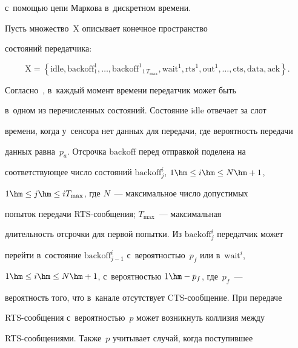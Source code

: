 с~по\-мощью цепи Маркова в~дискретном времени.











    Пусть множество~$\mathrm{X}$ описывает конечное пространство 


состояний передатчика:


\begin{equation*}


\mathrm{X}=\left\{ \mathrm{idle, backoff_1^1},\ldots , 


\mathrm{backoff^1}_{1\,T_{\max}}, \mathrm{wait}^1, 


\mathrm{rts}^1, \mathrm{out}^1, \ldots , \mathrm{cts}, \mathrm{data}, \mathrm{ack}\right\}.




\end{equation*}


Согласно~\cite{6-gai}, в~каждый момент времени передатчик может быть 


в~одном из перечисленных состояний. Состояние $\mathrm{idle}$ отвечает за слот 


времени, когда у~сенсора нет данных для передачи, где вероятность передачи 


данных равна~$p_a$. Отсрочка $\mathrm{backoff}$ перед отправкой поделена на 


соответствующее число состояний $\mathrm{backoff}_j^i$, $1\hm\leq i\hm\leq N\hm+1$, 


$1\hm\leq j\hm\leq i T_{\max}$, где $N$~--- максимальное число допустимых 


попыток передачи RTS-со\-об\-ще\-ния; $T_{\max}$~--- максимальная 


длительность отсрочки для первой попытки. Из $\mathrm{backoff}_j^i$ передатчик может 


перейти в~состояние $\mathrm{backoff}^i_{j-1}$ с~вероятностью~$p_f$ или в~$\mathrm{wait}^i$, 


$1\hm\leq i\hm\leq N\hm+1$, с~вероятностью $1\hm- p_f$, где~$p_f$~--- 


вероятность того, что в~канале отсутствует CTS-со\-об\-ще\-ние. При передаче 


RTS-со\-об\-ще\-ния с~вероятностью~$p$ может возникнуть коллизия между  


RTS-со\-об\-ще\-ни\-ями. Также~$p$ учитывает случай, когда поступившее 



